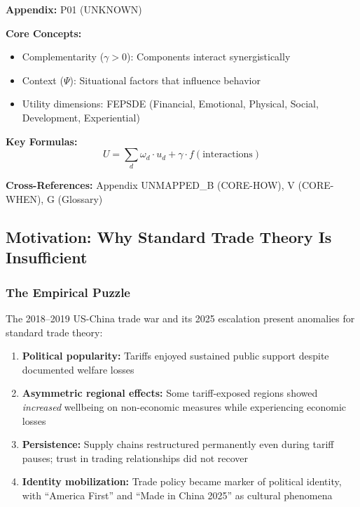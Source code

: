 \begin{tcolorbox}[colback=blue!5!white, colframe=blue!75!black,
    title=Quick Reference: Unknown]

\textbf{Appendix:} P01 (UNKNOWN)

\textbf{Core Concepts:}
\begin{itemize}[nosep]
\item Complementarity ($\gamma > 0$): Components interact synergistically
\item Context ($\Psi$): Situational factors that influence behavior
\item Utility dimensions: FEPSDE (Financial, Emotional, Physical, Social, Development, Experiential)
\end{itemize}

\textbf{Key Formulas:}
\begin{equation}
U = \sum_d \omega_d \cdot u_d + \gamma \cdot f(\text{interactions})
\end{equation}

\textbf{Cross-References:} Appendix UNMAPPED_B (CORE-HOW), V (CORE-WHEN), G (Glossary)
\end{tcolorbox}

\subsection{Motivation: Why Standard Trade Theory Is Insufficient}

\subsubsection{The Empirical Puzzle}

The 2018--2019 US-China trade war and its 2025 escalation present anomalies 
for standard trade theory:

\begin{enumerate}
    \item \textbf{Political popularity:} Tariffs enjoyed sustained public support 
    despite documented welfare losses \citep{amiti2019impact, fajgelbaum2020return}
    
    \item \textbf{Asymmetric regional effects:} Some tariff-exposed regions showed 
    \emph{increased} wellbeing on non-economic measures while experiencing economic losses
    
    \item \textbf{Persistence:} Supply chains restructured permanently even during 
    tariff pauses; trust in trading relationships did not recover
    
    \item \textbf{Identity mobilization:} Trade policy became marker of political 
    identity, with ``America First'' and ``Made in China 2025'' as cultural phenomena
\end{enumerate}

